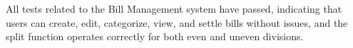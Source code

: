 \documentclass[12pt, titlepage]{article}
\begin{document}
All tests related to the Bill Management system have passed, indicating that users can create, edit, categorize, view, and settle bills without issues, and the split function operates correctly for both even and uneven divisions.



					
					
					


					

					
					
					




					
					
					



		
\end{document}
